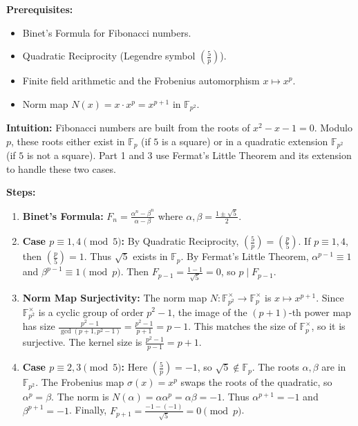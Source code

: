 \begin{solution}
\textbf{Prerequisites:}
\begin{itemize}
    \item Binet's Formula for Fibonacci numbers.
    \item Quadratic Reciprocity (Legendre symbol $\left(\frac{5}{p}\right)$).
    \item Finite field arithmetic and the Frobenius automorphism $x \mapsto x^p$.
    \item Norm map $N(x) = x \cdot x^p = x^{p+1}$ in $\mathbb{F}_{p^2}$.
\end{itemize}

\textbf{Intuition:}
Fibonacci numbers are built from the roots of $x^2-x-1=0$. Modulo $p$, these roots either exist in $\mathbb{F}_p$ (if $5$ is a square) or in a quadratic extension $\mathbb{F}_{p^2}$ (if $5$ is not a square). Part 1 and 3 use Fermat's Little Theorem and its extension to handle these two cases.

\par

\textbf{Steps:}
\begin{enumerate}
    \item \textbf{Binet's Formula:} $F_n = \frac{\alpha^n - \beta^n}{\alpha - \beta}$ where $\alpha, \beta = \frac{1 \pm \sqrt{5}}{2}$.

    \item \textbf{Case $p \equiv 1, 4 \pmod 5$:} By Quadratic Reciprocity, $\left(\frac{5}{p}\right) = \left(\frac{p}{5}\right)$. If $p \equiv 1, 4$, then $\left(\frac{p}{5}\right) = 1$. Thus $\sqrt{5}$ exists in $\mathbb{F}_p$. By Fermat's Little Theorem, $\alpha^{p-1} \equiv 1$ and $\beta^{p-1} \equiv 1 \pmod p$. Then $F_{p-1} = \frac{1-1}{\sqrt{5}} = 0$, so $p \mid F_{p-1}$.

    \item \textbf{Norm Map Surjectivity:} The norm map $N: \mathbb{F}_{p^2}^\times \to \mathbb{F}_p^\times$ is $x \mapsto x^{p+1}$. Since $\mathbb{F}_{p^2}^\times$ is a cyclic group of order $p^2-1$, the image of the $(p+1)$-th power map has size $\frac{p^2-1}{\gcd(p+1, p^2-1)} = \frac{p^2-1}{p+1} = p-1$. This matches the size of $\mathbb{F}_p^\times$, so it is surjective. The kernel size is $\frac{p^2-1}{p-1} = p+1$.

    \item \textbf{Case $p \equiv 2, 3 \pmod 5$:} Here $\left(\frac{5}{p}\right) = -1$, so $\sqrt{5} \notin \mathbb{F}_p$. The roots $\alpha, \beta$ are in $\mathbb{F}_{p^2}$. The Frobenius map $\sigma(x)=x^p$ swaps the roots of the quadratic, so $\alpha^p = \beta$. The norm is $N(\alpha) = \alpha \alpha^p = \alpha \beta = -1$. Thus $\alpha^{p+1} = -1$ and $\beta^{p+1} = -1$. Finally, $F_{p+1} = \frac{-1 - (-1)}{\sqrt{5}} = 0 \pmod p$.
\end{enumerate}
\end{solution}

